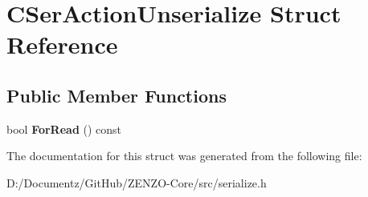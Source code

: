 \hypertarget{struct_c_ser_action_unserialize}{}\section{C\+Ser\+Action\+Unserialize Struct Reference}
\label{struct_c_ser_action_unserialize}
\subsection*{Public Member Functions}
\begin{DoxyCompactItemize}
\item 
\mbox{\label{struct_c_ser_action_unserialize_aa160459633ad25c544f43de0bbc7c4e7}} 
bool {\bfseries For\+Read} () const
\end{DoxyCompactItemize}


The documentation for this struct was generated from the following file\+:\begin{DoxyCompactItemize}
\item 
D\+:/\+Documentz/\+Git\+Hub/\+Z\+E\+N\+Z\+O-\/\+Core/src/serialize.\+h\end{DoxyCompactItemize}
